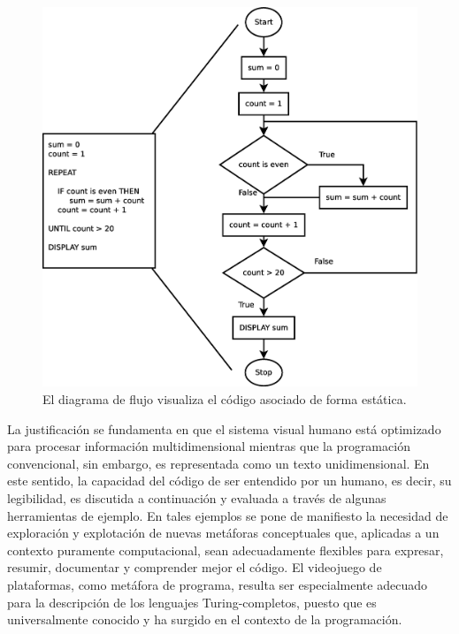 \documentclass{llncs}
\begin{document}
\begin{figure}[ht]
\begin{center}
\includegraphics[scale=0.25]{images/flowchart.eps}
\caption{El diagrama de flujo visualiza el código asociado de forma estática.
\label{fig:flowchart}}
\end{center}
\end{figure}

La justificación se fundamenta en que el sistema visual humano está optimizado para procesar información multidimensional mientras que la programación convencional, sin embargo, es representada como un texto unidimensional. En este sentido, la capacidad del código de ser entendido por un humano, es decir, su legibilidad, es discutida a continuación y evaluada a través de algunas herramientas de ejemplo. En tales ejemplos se pone de manifiesto la necesidad de exploración y explotación de nuevas metáforas conceptuales que, aplicadas a un contexto puramente computacional, sean adecuadamente flexibles para expresar, resumir, documentar y comprender mejor el código. El videojuego de plataformas, como metáfora de programa, resulta ser especialmente adecuado para la descripción de los lenguajes Turing-completos, puesto que es universalmente conocido y ha surgido en el contexto de la programación.
\end{document}
